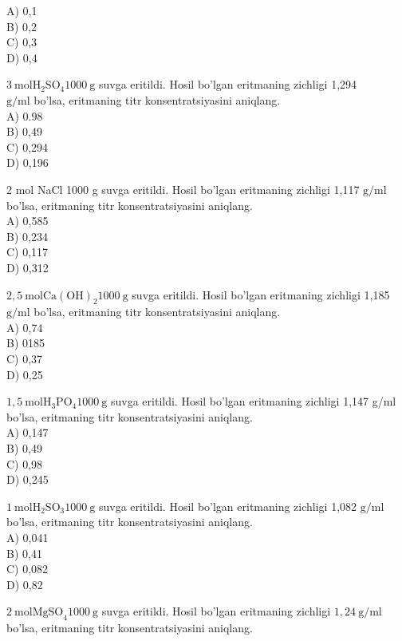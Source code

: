 A) 0,1\\
B) 0,2\\
C) 0,3\\
D) 0,4
  \item $3 \mathrm{~mol} \mathrm{H}_{2} \mathrm{SO}_{4} 1000 \mathrm{~g}$ suvga eritildi. Hosil bo'lgan eritmaning zichligi 1,294\\
$\mathrm{g} / \mathrm{ml}$ bo'lsa, eritmaning titr konsentratsiyasini aniqlang.\\
A) 0.98\\
B) 0,49\\
C) 0,294\\
D) 0,196
  \item 2 mol NaCl 1000 g suvga eritildi. Hosil bo'lgan eritmaning zichligi 1,117 $\mathrm{g} / \mathrm{ml}$ bo'lsa, eritmaning titr konsentratsiyasini aniqlang.\\
A) 0,585\\
B) 0,234\\
C) 0,117\\
D) 0,312
  \item $2,5 \mathrm{~mol} \mathrm{Ca}(\mathrm{OH})_{2} 1000 \mathrm{~g}$ suvga eritildi. Hosil bo'lgan eritmaning zichligi 1,185 $\mathrm{g} / \mathrm{ml}$ bo'lsa, eritmaning titr konsentratsiyasini aniqlang.\\
A) 0,74\\
B) 0185\\
C) 0,37\\
D) 0,25
  \item $1,5 \mathrm{~mol} \mathrm{H}_{3} \mathrm{PO}_{4} 1000 \mathrm{~g}$ suvga eritildi. Hosil bo'lgan eritmaning zichligi 1,147 g/ml bo'lsa, eritmaning titr konsentratsiyasini aniqlang.\\
A) 0,147\\
B) 0,49\\
C) 0,98\\
D) 0,245
  \item $1 \mathrm{~mol} \mathrm{H}_{2} \mathrm{SO}_{3} 1000 \mathrm{~g}$ suvga eritildi. Hosil bo'lgan eritmaning zichligi 1,082 $\mathrm{g} / \mathrm{ml}$ bo'lsa, eritmaning titr konsentratsiyasini aniqlang.\\
A) 0,041\\
B) 0,41\\
C) 0,082\\
D) 0,82
  \item $2 \mathrm{~mol} \mathrm{MgSO}_{4} 1000 \mathrm{~g}$ suvga eritildi. Hosil bo'lgan eritmaning zichligi $1,24 \mathrm{~g} / \mathrm{ml}$ bo'lsa, eritmaning titr konsentratsiyasini aniqlang.\\
